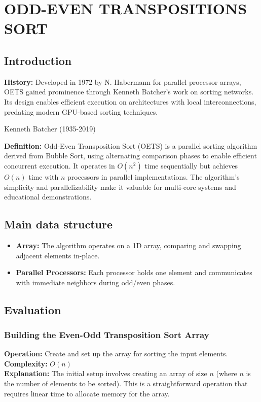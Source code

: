 \section{ODD-EVEN TRANSPOSITIONS SORT}

\subsection{Introduction}
\textbf{History:} Developed in 1972 by N. Habermann for parallel processor arrays, OETS gained prominence through Kenneth Batcher's work on sorting networks. Its design enables efficient execution on architectures with local interconnections, predating modern GPU-based sorting techniques.

Kenneth Batcher (1935-2019)

\textbf{Definition:} Odd-Even Transposition Sort (OETS) is a parallel sorting algorithm derived from Bubble Sort, using alternating comparison phases to enable efficient concurrent execution. It operates in $O(n^2)$ time sequentially but achieves $O(n)$ time with $n$ processors in parallel implementations. The algorithm's simplicity and parallelizability make it valuable for multi-core systems and educational demonstrations.

\subsection{Main data structure}
\begin{itemize}
    \item \textbf{Array:} The algorithm operates on a 1D array, comparing and swapping adjacent elements in-place.
    \item \textbf{Parallel Processors:} Each processor holds one element and communicates with immediate neighbors during odd/even phases.
\end{itemize}

\subsection{Evaluation}
\subsubsection{Building the Even-Odd Transposition Sort Array}
\textbf{Operation:} Create and set up the array for sorting the input elements. \\
\textbf{Complexity:} $O(n)$ \\
\textbf{Explanation:} The initial setup involves creating an array of size $n$ (where $n$ is the number of elements to be sorted). This is a straightforward operation that requires linear time to allocate memory for the array.

